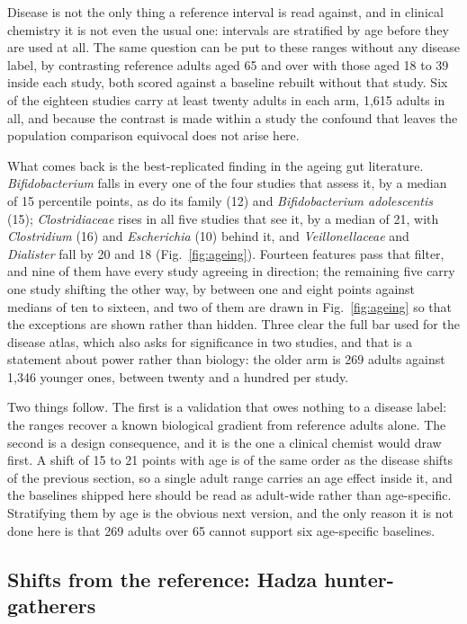 \documentclass[conference]{IEEEtran}
\begin{document}
Disease is not the only thing a reference interval is read against, and in clinical chemistry it is not even the usual one: intervals are stratified by age before they are used at all. The same question can be put to these ranges without any disease label, by contrasting reference adults aged 65 and over with those aged 18 to 39 inside each study, both scored against a baseline rebuilt without that study. Six of the eighteen studies carry at least twenty adults in each arm, 1{,}615 adults in all, and because the contrast is made within a study the confound that leaves the population comparison equivocal does not arise here.

What comes back is the best-replicated finding in the ageing gut literature. \textit{Bifidobacterium} falls in every one of the four studies that assess it, by a median of 15 percentile points, as do its family (12) and \textit{Bifidobacterium adolescentis} (15); \textit{Clostridiaceae} rises in all five studies that see it, by a median of 21, with \textit{Clostridium} (16) and \textit{Escherichia} (10) behind it, and \textit{Veillonellaceae} and \textit{Dialister} fall by 20 and 18 (Fig.~\ref{fig:ageing}). Fourteen features pass that filter, and nine of them have every study agreeing in direction; the remaining five carry one study shifting the other way, by between one and eight points against medians of ten to sixteen, and two of them are drawn in Fig.~\ref{fig:ageing} so that the exceptions are shown rather than hidden. Three clear the full bar used for the disease atlas, which also asks for significance in two studies, and that is a statement about power rather than biology: the older arm is 269 adults against 1{,}346 younger ones, between twenty and a hundred per study.

Two things follow. The first is a validation that owes nothing to a disease label: the ranges recover a known biological gradient from reference adults alone. The second is a design consequence, and it is the one a clinical chemist would draw first. A shift of 15 to 21 points with age is of the same order as the disease shifts of the previous section, so a single adult range carries an age effect inside it, and the baselines shipped here should be read as adult-wide rather than age-specific. Stratifying them by age is the obvious next version, and the only reason it is not done here is that 269 adults over 65 cannot support six age-specific baselines.

\subsection{Shifts from the reference: Hadza hunter-gatherers}
\end{document}

